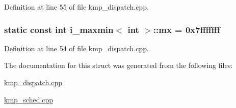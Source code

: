 Definition at line 55 of file kmp\-\_\-dispatch.\-cpp.

\hypertarget{structi__maxmin_3_01int_01_4_aab31e71385a47754964cfb0d06ed4ba8}{
\subsubsection[{mx}]{\setlength{\rightskip}{0pt plus 5cm}static const {\bf int} {\bf i\-\_\-maxmin}$<$ {\bf int} $>$\-::mx = 0x7fffffff\hspace{0.3cm}{\ttfamily [static]}}}\label{structi__maxmin_3_01int_01_4_aab31e71385a47754964cfb0d06ed4ba8}


Definition at line 54 of file kmp\-\_\-dispatch.\-cpp.



The documentation for this struct was generated from the following files\-:\begin{DoxyCompactItemize}
\item 
\hyperlink{kmp__dispatch_8cpp}{kmp\-\_\-dispatch.\-cpp}\item 
\hyperlink{kmp__sched_8cpp}{kmp\-\_\-sched.\-cpp}\end{DoxyCompactItemize}
